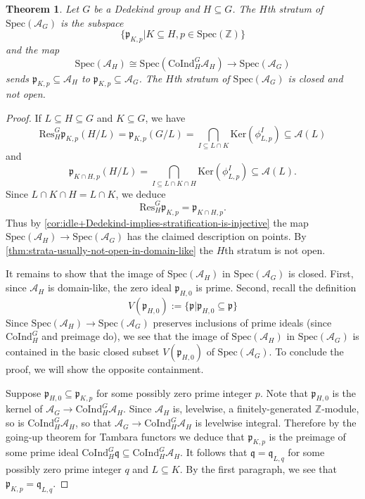 \documentclass[11pt,dvipsnames]{amsart}
\newcommand{\Z}{\mathbb{Z}}
\newcommand{\A}{\mathcal{A}}
\newcommand{\p}{\mathfrak{p}}
\newcommand{\q}{\mathfrak{q}}
\newtheorem{theorem}{Theorem}[section]
\theoremstyle{BoldRemark}
\newcommand{\Res}{\mathrm{Res}}
\newcommand{\Spec}{\mathrm{Spec}}
\newcommand{\Coind}{\mathrm{CoInd}}
\renewcommand{\subset}{\subseteq}
\begin{document}
\begin{theorem}\label{thm:strata-of-Burnside-G-Dedekind}
    Let $G$ be a Dedekind group and $H \subset G$. The $H$th stratum of $\Spec(\A_G)$ is the subspace 
    \[ 
        \{ \p_{K,p} | K \subset H, p \in \Spec(\Z) \}
    \]
    and the map 
    \[ 
        \Spec(\A_H) \cong \Spec(\Coind_H^G \A_H) \rightarrow \Spec(\A_G) 
    \] 
    sends $\p_{K,p} \subset \A_H$ to $\p_{K,p} \subset \A_G$. The $H$th stratum of $\Spec(\A_G)$ is closed and not open.
\end{theorem}

\begin{proof}
    If $L \subset H \subset G$ and $K \subset G$, we have 
    \[ 
        \Res_H^G \p_{K,p}(H/L) = \p_{K,p}(G/L) = \bigcap_{I \subset L \cap K} \mathrm{Ker}(\phi_{L,p}^I) \subset \A(L) 
    \] 
    and
    \[ 
        \p_{K \cap H,p}(H/L) = \bigcap_{I \subset L \cap K \cap H} \mathrm{Ker}(\phi_{L,p}^I) \subset \A(L) .
    \] 
    Since $L \cap K \cap H = L \cap K$, we deduce
    \[ 
        \Res_H^G \p_{K,p} = \p_{K \cap H,p} .
    \]
    Thus by \cref{cor:idle+Dedekind-implies-stratification-is-injective} the map $\Spec(\A_H) \rightarrow \Spec(\A_G)$ has the claimed description on points. By \cref{thm:strata-usually-not-open-in-domain-like} the $H$th stratum is not open.

    It remains to show that the image of $\Spec(\A_H)$ in $\Spec(\A_G)$ is closed. First, since $\A_H$ is domain-like, the zero ideal $\p_{H,0}$ is prime. Second, recall the definition 
    \[ 
        V(\p_{H,0}) := \{ \p | \p_{H,0} \subset \p \} 
    \]
    Since $\Spec(\A_H) \rightarrow \Spec(\A_G)$ preserves inclusions of prime ideals (since $\Coind_H^G$ and preimage do), we see that the image of $\Spec(\A_H)$ in $\Spec(\A_G)$ is contained in the basic closed subset $V(\p_{H,0})$ of $\Spec(\A_G)$. To conclude the proof, we will show the opposite containment.

    Suppose $\p_{H,0} \subset \p_{K,p}$ for some possibly zero prime integer $p$. Note that $\p_{H,0}$ is the kernel of $\A_G \rightarrow \Coind_H^G \A_H$. Since $\A_H$ is, levelwise, a finitely-generated $\Z$-module, so is $\Coind_H^G \A_H$, so that $\A_G \rightarrow \Coind_H^G \A_H$ is levelwise integral. Therefore by the going-up theorem for Tambara functors \cite[Theorem 5.9]{4DS} we deduce that $\p_{K,p}$ is the preimage of some prime ideal $\Coind_H^G \q \subset \Coind_H^G \A_H$. It follows that $\q = \q_{L,q}$ for some possibly zero prime integer $q$ and $L \subset K$. By the first paragraph, we see that $\p_{K,p} = \q_{L,q}$.
\end{proof}
\end{document}
